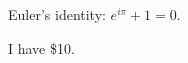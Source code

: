 \documentclass{article}
\begin{document}
Euler's identity: $ e^{i \pi} + 1 = 0 $.

I have \$10.
\end{document}
